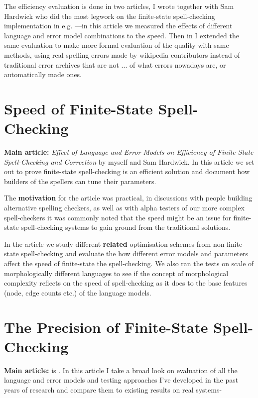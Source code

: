 \documentclass[officiallayout,draft]{unihelcompling}
\begin{document}
The efficiency evaluation is done in two articles, \cite{pirinen2012effects} I
wrote together with Sam Hardwick who did the most legwork on the finite-state
spell-checking implementation in e.g. \cite{linden2011hfst}---in this article
we measured the effects of different language and error model combinations to
the speed. Then in \cite{pirinen2013quality} I extended the same evaluation to
make more formal evaluation of the quality with same methods, using real
spelling errors made by wikipedia contributors instead of traditional error
archives that are not ...  of what errors nowadays are, or automatically made
ones.

\section{Speed of Finite-State Spell-Checking}

\textbf{Main article:} \emph{Effect of Language and Error Models on Efficiency
of Finite-State Spell-Checking and Correction} by myself and Sam Hardwick. In
this article we set out to prove finite-state spell-checking is an efficient
solution and document how builders of the spellers can tune their parameters.

The \textbf{motivation} for the article was practical, in discussions with
people building alternative spelling checkers, as well as with alpha testers of
our more complex spell-checkers it was commonly noted that the speed might be
an issue for finite-state spell-checking systems to gain ground from the
traditional solutions. 

In the article we study different \textbf{related} optimisation schemes from
non-finite-state spell-checking and evaluate the how different error models and
parameters affect the speed of finite-state the spell-checking. We also ran the
tests on scale of morphologically different languages to see if the concept of
morphological complexity reflects on the speed of spell-checking as it does to
the base features (node, edge counts etc.) of the language models.

\section{The Precision of Finite-State Spell-Checking}

\textbf{Main article:} is . In this article I take a broad
look on evaluation of all the language and error models and testing approaches
I've developed in the past years of research and compare them to existing
results on real systems-
\end{document}
